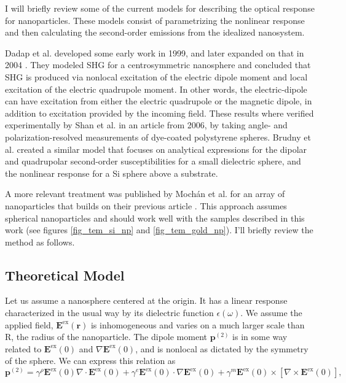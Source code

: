\documentclass[10pt]{article}
\begin{document}
I will briefly review some of the current models for describing the optical response for nanoparticles. These models consist of parametrizing the nonlinear response and then calculating the second-order emissions from the idealized nanosystem.

Dadap et al. \cite{dadap1999second} developed some early work in 1999, and later expanded on that in 2004 \cite{dadap2004theory}. They modeled SHG for a centrosymmetric nanosphere and concluded that SHG is produced via nonlocal excitation of the electric dipole moment and local excitation of the electric quadrupole moment. In other words, the electric-dipole can have excitation from either the electric quadrupole or the magnetic dipole, in addition to excitation provided by the incoming field. These results where verified experimentally by Shan et al. \cite{shan2006experimental} in an article from 2006, by taking angle- and polarization-resolved measurements of dye-coated polystyrene spheres. Brudny et al. \cite{brudny2000second} created a similar model that focuses on analytical expressions for the dipolar and quadrupolar second-order susceptibilities for a small dielectric sphere, and the nonlinear response for a Si sphere above a substrate.    

A more relevant treatment was published by Moch\'an et al. for an array of nanoparticles \cite{mochán2003second} that builds on their previous article \cite{brudny2000second}. This approach assumes spherical nanoparticles and should work well with the samples described in this work (see figures \ref{fig_tem_si_np} and \ref{fig_tem_gold_np}). I'll briefly review the method as follows.

\subsection{Theoretical Model}\label{mochan}
Let us assume a nanosphere centered at the origin. It has a linear response characterized in the usual way by its dielectric function $\epsilon(\omega)$. We assume the applied field, $\mathbf{E}^{\text{ex}}(\mathbf{r})$ is inhomogeneous and varies on a much larger scale than R, the radius of the nanoparticle. The dipole moment $\mathbf{p}^{(2)}$ is in some way related to $\mathbf{E}^{\text{ex}}(0)$ and $\nabla\mathbf{E}^{\text{ex}}(0)$, and is nonlocal as dictated by the symmetry of the sphere. We can express this relation as
\begin{equation}
\mathbf{p}^{(2)} = \gamma^{\rho}\mathbf{E}^{\text{ex}}(0)\nabla\cdot\mathbf{E}^{\text{ex}}(0) + \gamma^{e}\mathbf{E}^{\text{ex}}(0)\cdot\nabla\mathbf{E}^{\text{ex}}(0) + \gamma^{m}\mathbf{E}^{\text{ex}}(0)\times\left[\nabla\times\mathbf{E}^{\text{ex}}(0)\right],
\end{equation}
\end{document}
